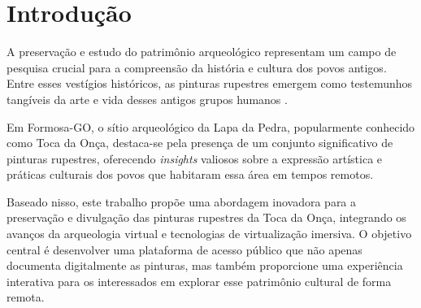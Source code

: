 \chapter{Introdução}\label{Introducao}

A preservação e estudo do patrimônio arqueológico representam um campo de pesquisa crucial para a compreensão da história e cultura dos povos antigos. Entre esses vestígios históricos, as pinturas rupestres emergem como testemunhos tangíveis da arte e vida desses antigos grupos humanos \citep{guimaraes2013}.



Em Formosa-GO, o sítio arqueológico da Lapa da Pedra, popularmente conhecido como Toca da Onça, destaca-se pela presença de um conjunto significativo de pinturas rupestres, oferecendo \textit{insights} valiosos sobre a expressão artística e práticas culturais dos povos que habitaram essa área em tempos remotos.
    
Baseado nisso, este trabalho propõe uma abordagem inovadora para a preservação e divulgação das pinturas rupestres da Toca da Onça, integrando os avanços da arqueologia virtual e tecnologias de virtualização imersiva. O objetivo central é desenvolver uma plataforma de acesso público que não apenas documenta digitalmente as pinturas, mas também proporcione uma experiência interativa para os interessados em explorar esse patrimônio cultural de forma remota.

